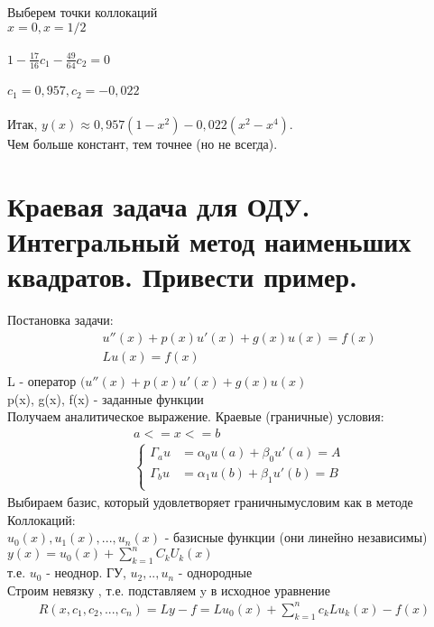 \documentclass[12pt,a4paper]{article}
\begin{document}
	Выберем точки коллокаций\\
	$x = 0, x = 1/2$\\\\
	$1-\displaystyle\frac{17}{16}c_1 -\displaystyle\frac{49}{64}c_2 = 0$\\\\
	$c_1 = 0, 957, c_2 = -0,022$\\\\
	Итак, $y(x) \approx 0,957 (1-x^2) - 0,022 (x^2-x^4)$.\\
	Чем больше констант, тем точнее (но не всегда).
	\section{Краевая задача для ОДУ. Интегральный метод наименьших квадратов. Привести пример.}
	Постановка задачи:\\
	\begin{align*}
	&u''(x) + p(x) u'(x) + g(x)u(x) = f(x)\\
	&Lu(x) = f(x)\\	
	\end{align*}
	L - оператор $(u''(x) + p(x)u'(x) + g(x)u(x)$\\
	p(x), g(x), f(x) - заданные функции\\
	Получаем аналитическое выражение. Краевые (граничные) условия:\\
	\begin{align*}	
	&a <= x <= b\\
	&\begin{cases}
	\varGamma_a u &= \alpha_0 u(a) + \beta_0 u'(a) = A\\
	\varGamma_b u &= \alpha_1 u(b) + \beta_1 u'(b) = B\\
	\end{cases}
	\end{align*}
	Выбираем базис, который удовлетворяет граничнымусловим как в методе Коллокаций:\\
	$u_0(x), u_1(x), ..., u_n(x)$ - базисные функции (они линейно независимы)\\
	$y(x) = u_0(x) + \sum_{k=1}^{n}C_k U_k(x)$\\
	т.е. $u_0$ - неоднор. ГУ, $u_2, .., u_n$ - однородные\\
	Строим невязку , т.е. подставляем y в исходное уравнение\\
	\begin{align*}
	R(x, c_1, c_2, ..., c_n) = Ly - f = Lu_0(x) + \sum_{k=1}^{n}c_k L u_k(x) - f(x)\\
	\end{align*}
\end{document}
